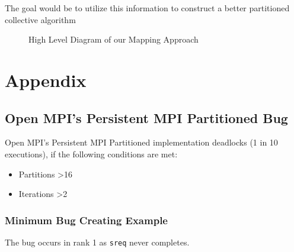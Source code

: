 \documentclass{article}
\begin{document}
  \noindent
  The goal would be to utilize this information to construct a better
  partitioned collective algorithm

  \begin{figure}[h]
    \centering
    \usetikzlibrary{math}
    \caption{High Level Diagram of our Mapping Approach}
  \end{figure}

  \clearpage
  \appendix
  \section{Appendix}
  \label{app:pcomm:bug}
  \subsection{Open MPI's Persistent MPI Partitioned Bug}
  \noindent
  Open MPI's Persistent MPI Partitioned implementation deadlocks (1 in 10 executions),
  if the following conditions are met:
  \begin{itemize}
    \item Partitions \textgreater 16
    \item Iterations \textgreater 2
  \end{itemize}

  \subsubsection{Minimum Bug Creating Example}
  The bug occurs in rank 1 as \texttt{sreq} never completes.
  \singlespacing
  
  \doublespacing
\end{document}
